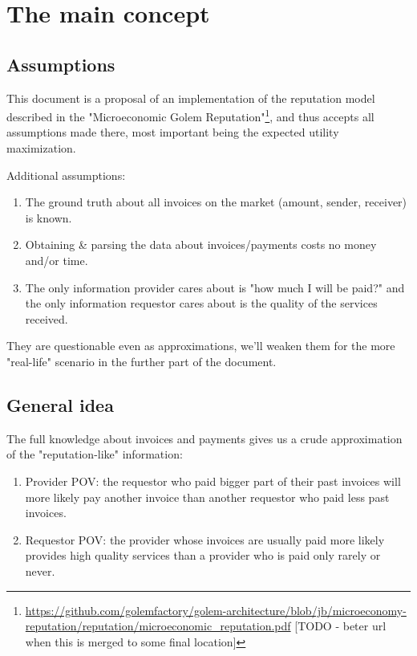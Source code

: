 \documentclass{article}
\begin{document}
\section{The main concept}
\subsection{Assumptions}

This document is a proposal of an implementation of the reputation model described in the "Microeconomic Golem Reputation"\footnote{
\href{https://github.com/golemfactory/golem-architecture/blob/jb/microeconomy-reputation/reputation/microeconomic\_reputation.pdf}
     {https://github.com/golemfactory/golem-architecture/blob/jb/microeconomy-reputation/reputation/microeconomic\_reputation.pdf}
[TODO - beter url when this is merged to some final location]}, and thus accepts all assumptions made there, most important being
the expected utility maximization.
    
Additional assumptions:

\begin{enumerate}
    \item The ground truth about all invoices on the market (amount, sender, receiver) is known.
    \item Obtaining \& parsing the data about invoices/payments costs no money and/or time.
    \item The only information provider cares about is "how much I will be paid?" and the only information requestor cares about
        is the quality of the services received.
\end{enumerate}

They are questionable even as approximations, we'll weaken them for the more "real-life" scenario in the further part of the document.

\subsection{General idea}

The full knowledge about invoices and payments gives us a crude approximation of the "reputation-like" information:
\begin{enumerate}
    \item Provider POV: the requestor who paid bigger part of their past invoices will more likely pay another invoice than another requestor
        who paid less past invoices.
    \item Requestor POV: the provider whose invoices are usually paid more likely provides high quality services than a provider who is paid
        only rarely or never.
\end{enumerate}
\end{document}
